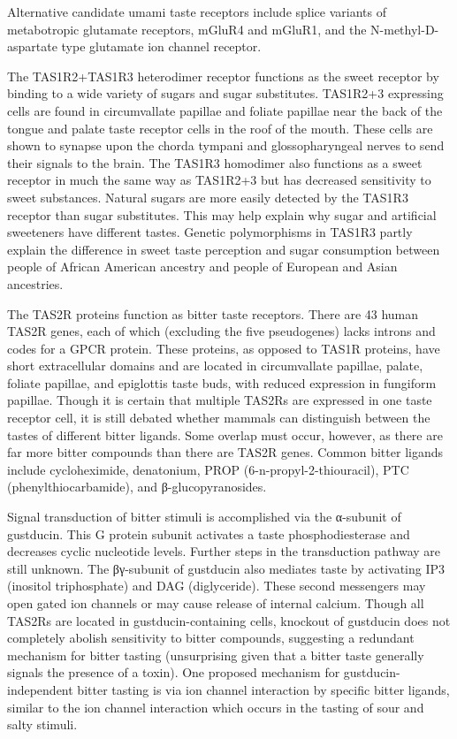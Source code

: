 \documentclass[]{book}
\begin{document}
Alternative candidate umami taste receptors include splice variants of metabotropic glutamate receptors, mGluR4 and mGluR1, and the N-methyl-D-aspartate type glutamate ion channel receptor.

The TAS1R2+TAS1R3 heterodimer receptor functions as the sweet receptor by binding to a wide variety of sugars and sugar substitutes. TAS1R2+3 expressing cells are found in circumvallate papillae and foliate papillae near the back of the tongue and palate taste receptor cells in the roof of the mouth. These cells are shown to synapse upon the chorda tympani and glossopharyngeal nerves to send their signals to the brain. The TAS1R3 homodimer also functions as a sweet receptor in much the same way as TAS1R2+3 but has decreased sensitivity to sweet substances. Natural sugars are more easily detected by the TAS1R3 receptor than sugar substitutes. This may help explain why sugar and artificial sweeteners have different tastes. Genetic polymorphisms in TAS1R3 partly explain the difference in sweet taste perception and sugar consumption between people of African American ancestry and people of European and Asian ancestries.

The TAS2R proteins function as bitter taste receptors. There are 43 human TAS2R genes, each of which (excluding the five pseudogenes) lacks introns and codes for a GPCR protein. These proteins, as opposed to TAS1R proteins, have short extracellular domains and are located in circumvallate papillae, palate, foliate papillae, and epiglottis taste buds, with reduced expression in fungiform papillae. Though it is certain that multiple TAS2Rs are expressed in one taste receptor cell, it is still debated whether mammals can distinguish between the tastes of different bitter ligands. Some overlap must occur, however, as there are far more bitter compounds than there are TAS2R genes. Common bitter ligands include cycloheximide, denatonium, PROP (6-n-propyl-2-thiouracil), PTC (phenylthiocarbamide), and β-glucopyranosides.

Signal transduction of bitter stimuli is accomplished via the α-subunit of gustducin. This G protein subunit activates a taste phosphodiesterase and decreases cyclic nucleotide levels. Further steps in the transduction pathway are still unknown. The βγ-subunit of gustducin also mediates taste by activating IP3 (inositol triphosphate) and DAG (diglyceride). These second messengers may open gated ion channels or may cause release of internal calcium. Though all TAS2Rs are located in gustducin-containing cells, knockout of gustducin does not completely abolish sensitivity to bitter compounds, suggesting a redundant mechanism for bitter tasting (unsurprising given that a bitter taste generally signals the presence of a toxin). One proposed mechanism for gustducin-independent bitter tasting is via ion channel interaction by specific bitter ligands, similar to the ion channel interaction which occurs in the tasting of sour and salty stimuli.
\end{document}
